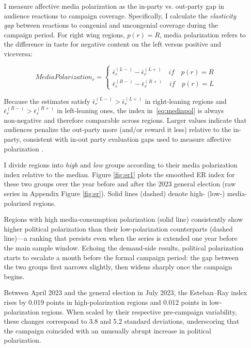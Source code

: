 \documentclass[12pt]{article}
\begin{document}
I measure affective media polarization as the in-party vs. out-party gap in audience reactions to campaign coverage. Specifically, I calculate the \emph{elasticity gap} between reactions to congenial and uncongenial coverage during the campaign period. For right wing regions, $p(r)=R$, media polarization refers to the difference in taste for negative content on the left versus positive and viceversa: 


\begin{equation}
	MediaPolarization_r  =	\begin{cases}
		\bar{\epsilon}_r^{(L-)}- \bar{\epsilon}_r^{(L+)} \quad if \quad p(r)=R\\
		\bar{\epsilon}_r^{(R-)}- \bar{\epsilon}_r^{(R+)} \quad if \quad p(r)=L
	\end{cases}
		\label{eq:mediapol}
\end{equation}

Because the estimates satisfy
\(\bar{\epsilon}_r^{(L-)}>\bar{\epsilon}_r^{(L+)}\) in right‑leaning regions and
\(\bar{\epsilon}_r^{(R-)}>\bar{\epsilon}_r^{(R+)}\) in left‑leaning ones,
the index in~\eqref{eq:mediapol} is always non‑negative and therefore comparable across regions. Larger values indicate that audiences penalize the out-party more (and/or reward it less) relative to the in-party, consistent with  in-out party evaluation gaps used to measure affective polarization  \citep{IyengarLelkesLevendusky2019Origins}.

I divide regions into \textit{high} and \textit{low} groups according to their media polarization index relative to the median. Figure \ref{fig:er1} plots the smoothed ER index for these two groups over the year before and after the 2023 general election (raw series in Appendix Figure \ref{fig:er}). Solid lines (dashed) denote high- (low-) media-polarized regions.

Regions with high media‑consumption polarization (solid line) consistently show higher political polarization than their low‑polarization counterparts (dashed line)—a ranking that persists even when the series is extended one year before the main sample window. Echoing the demand‑side results, political polarization starts to escalate a month before the formal campaign period: the gap between the two groups first narrows slightly, then widens sharply once the campaign begins.

Between April 2023 and the general election in July 2023, the Esteban–Ray index rises by 0.019 points in high-polarization regions and 0.012 points in low-polarization regions. When scaled by their respective pre-campaign variability, these changes correspond to 3.8 and 5.2 standard deviations, underscoring that the campaign coincided with an unusually abrupt increase in political polarization.
\end{document}
